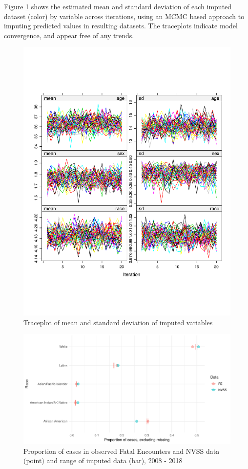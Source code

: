 \documentclass{article}
\begin{document}
Figure \ref{fig:traceplot} shows the estimated mean and standard deviation of each imputed dataset (color) by variable across iterations, using an MCMC based approach to imputing predicted values in resulting datasets. The traceplots indicate model convergence, and appear free of any trends. 

\begin{figure}
	\centering
	\includegraphics[width = \linewidth]{vis/imp_trace_1.pdf}
	\caption{Traceplot of mean and standard deviation of imputed variables}
	\label{fig:traceplot}
\end{figure}

\begin{figure}
	\centering
	\includegraphics[width = \linewidth]{vis/race_impute_pct.pdf}
	\caption{Proportion of cases in observed Fatal Encounters and NVSS data (point) and range of imputed data (bar), 2008 - 2018}
	\label{fig:race_impute_pct}
\end{figure}
\end{document}
